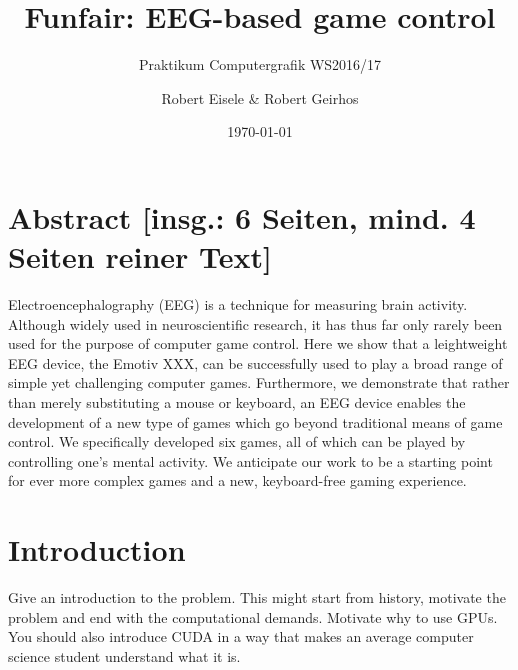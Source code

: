 \documentclass{utue} %
\title{Funfair: EEG-based game control}
\author{Robert Eisele \& Robert Geirhos}
\date{\today}
\subtitle{Praktikum Computergrafik WS2016/17}
\begin{document}

\maketitle

\section*{Abstract [insg.: 6 Seiten, mind. 4 Seiten reiner Text]}

Electroencephalography (EEG) is a technique for measuring brain activity. Although widely used in neuroscientific research, it has thus far only rarely been used for the purpose of computer game control. Here we show that a leightweight EEG device, the Emotiv XXX, can be successfully used to play a broad range of simple yet challenging computer games. Furthermore, we demonstrate that rather than merely substituting a mouse or keyboard, an EEG device enables the development of a new type of games which go beyond traditional means of game control. We specifically developed six games, all of which can be played by controlling one's mental activity. We anticipate our work to be a starting point for ever more complex games and a new, keyboard-free gaming experience.




\section{Introduction}

Give an introduction to the problem. This might start from history, motivate the problem and end with the computational demands. Motivate why to use GPUs. You should also introduce CUDA in a way that makes an average computer science student understand what it is.
\end{document}
